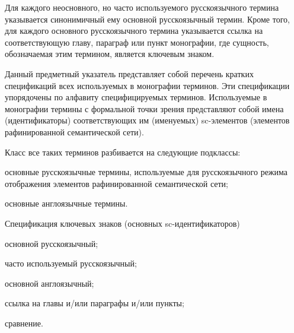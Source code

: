 \begin{partbacktext}
\bigskip

Для каждого неосновного, но часто используемого русскоязычного термина указывается синонимичный ему основной русскоязычный термин. Кроме того, для каждого основного русскоязычного термина указывается ссылка на соответствующую главу, параграф или пункт монографии, где сущность, обозначаемая этим термином, является ключевым знаком.

Данный предметный указатель представляет собой перечень кратких спецификаций всех используемых в монографии терминов. Эти спецификации упорядочены по алфавиту специфицируемых терминов. Используемые в монографии термины с формальной точки зрения представляют собой имена (идентификаторы) соответствующих им (именуемых) sc-элементов (элементов рафинированной семантической сети).

Класс все таких терминов разбивается на следующие подклассы:
\begin{textitemize}
	\item основные русскоязычные термины, используемые  для русскоязычного режима отображения элементов рафинированной семантической сети;
	\item основные англоязычные термины.
\end{textitemize}

\begin{SCn}
	\begin{scnitemize}
		\item Спецификация ключевых знаков (основных sc-идентификаторов)
		\begin{scnitemize}
			\item основной русскоязычный;
			\item часто используемый русскоязычный;
			\item основной англоязычный;
			\item ссылка на главы и/или параграфы и/или пункты;
			\item сравнение.
		\end{scnitemize}
	\end{scnitemize}
\end{SCn}
\end{partbacktext}

